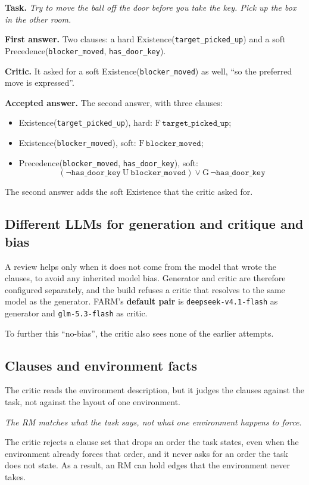 \documentclass[11pt,english,listoffigures,listoftables]{tfgetsinf}
\newcommand{\keyidea}[1]{\par\smallskip\noindent\hspace*{0.6em}{\color{gray!55}\vrule width 1.5pt}\hspace{8pt}\parbox[t]{\dimexpr\linewidth-0.6em-9.5pt\relax}{\itshape #1}\par\smallskip}  %
\begin{document}
\textbf{Task.} \textit{Try to move the ball off the door before you take the key. Pick up the box in the other room.}

\textbf{First answer.} Two clauses: a hard Existence(\texttt{target\_picked\_up}) and a soft Precedence(\texttt{blocker\_moved}, \texttt{has\_door\_key}).

\textbf{Critic.} It asked for a soft Existence(\texttt{blocker\_moved}) as well, ``so the preferred move is expressed''.

\textbf{Accepted answer.} The second answer, with three clauses:
\begin{itemize}
    \item Existence(\texttt{target\_picked\_up}), hard: $\mathrm{F}\,\texttt{target\_picked\_up}$;
    \item Existence(\texttt{blocker\_moved}), soft: $\mathrm{F}\,\texttt{blocker\_moved}$;
    \item Precedence(\texttt{blocker\_moved}, \texttt{has\_door\_key}), soft:\[(\neg\texttt{has\_door\_key}\ \mathrm{U}\ \texttt{blocker\_moved}) \lor \mathrm{G}\,\neg\texttt{has\_door\_key}\]
\end{itemize}
The second answer adds the soft Existence that the critic asked for.

\subsection{Different LLMs for generation and critique and bias}
A review helps only when it does not come from the model that wrote the clauses, to avoid any inherited model bias. Generator and critic are therefore configured separately, and the build refuses a critic that resolves to the same model as the generator. FARM's \textbf{default pair} is \texttt{deepseek-v4.1-flash} as generator and \texttt{glm-5.3-flash} as critic.

\noindent To further this ``no-bias'', the critic also sees none of the earlier attempts.

\subsection{Clauses and environment facts}
The critic reads the environment description, but it judges the clauses against the task, not against the layout of one environment.

\keyidea{The RM matches what the task says, not what one environment happens to force.}
\noindent The critic rejects a clause set that drops an order the task states, even when the environment already forces that order, and it never asks for an order the task does not state. As a result, an RM can hold edges that the environment never takes.
\end{document}
